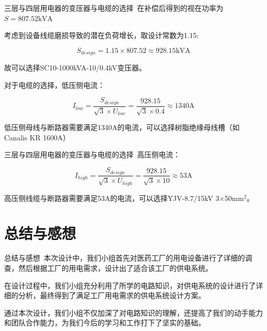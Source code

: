 \documentclass{beamer}
\begin{document}
\begin{frame}{三层与四层用电器的变压器与电缆的选择}{\thesubsection \, \subsecname}
    在补偿后得到的视在功率为$S=807.52\text{kVA}$

考虑到设备线缆磨损导致的潜在负荷增长，取设计常数为1.15:

$$S_{design}= 1.15 \times 807.52 \approx 928.15\text{kVA}$$

故可以选择SC10-1000kVA-10/0.4kV变压器。

对于电缆的选择，低压侧电流：

$$I_{low} = \frac{S_{design}}{\sqrt{3} \times U_{low}} = \frac{928.15}{\sqrt{3} \times 0.4} \approx 1340\text{A}$$

低压侧母线与断路器需要满足1340A的电流，可以选择树脂绝缘母线槽（如 Canalis KR 1600A）
    \end{frame}
\begin{frame}{三层与四层用电器的变压器与电缆的选择}{\thesubsection \, \subsecname}
高压侧电流：

$$I_{high} = \frac{S_{design}}{\sqrt{3} \times U_{high}} = \frac{928.15}{\sqrt{3} \times 10} \approx 53\text{A}$$

高压侧线缆与断路器需要满足53A的电流，可以选择YJV-8.7/15kV 3×50$\text{mm}^2$。
    \end{frame}

\section{总结与感想}
\begin{frame}{总结与感想}{\thesection \, \secname}
    本次设计中，我们小组首先对医药工厂的用电设备进行了详细的调查，然后根据工厂的用电需求，设计出了适合该工厂的供电系统。

    在设计过程中，我们小组充分利用了所学的电路知识，对供电系统的设计进行了详细的分析，最终得到了满足工厂用电需求的供电系统设计方案。

    通过本次设计，我们小组不仅加深了对电路知识的理解，还提高了我们的动手能力和团队合作能力，为我们今后的学习和工作打下了坚实的基础。
\end{frame}
\end{document}
